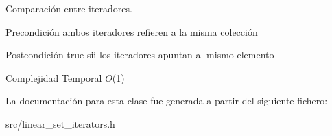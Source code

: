 Comparación entre iteradores. 

\begin{DoxyPrecond}{Precondición}
ambos iteradores refieren a la misma colección 
\end{DoxyPrecond}
\begin{DoxyPostcond}{Postcondición}
true sii los iteradores apuntan al mismo elemento
\end{DoxyPostcond}

\begin{DoxyDescription}
\item[Complejidad Temporal]$O$(1)
\end{DoxyDescription}

La documentación para esta clase fue generada a partir del siguiente fichero\+:\begin{DoxyCompactItemize}
\item 
src/linear\+\_\+set\+\_\+iterators.\+h\end{DoxyCompactItemize}
